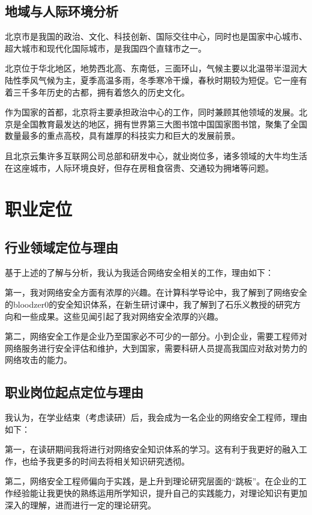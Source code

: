 \documentclass{article}
\begin{document}
\subsection{地域与人际环境分析}

北京市是我国的政治、文化、科技创新、国际交往中心，同时也是国家中心城市、超大城市和现代化国际城市，是我国四个直辖市之一。

北京位于华北地区，地势西北高、东南低，三面环山，气候主要以北温带半湿润大陆性季风气候为主，夏季高温多雨，冬季寒冷干燥，春秋时期较为短促。它一座有着三千多年历史的古都，拥有着悠久的历史文化。

作为国家的首都，北京将主要承担政治中心的工作，同时兼顾其他领域的发展。北京是全国教育最发达的地区，拥有世界第三大图书馆中国国家图书馆，聚集了全国数量最多的重点高校，具有雄厚的科技实力和巨大的发展前景。

且北京云集许多互联网公司总部和研发中心，就业岗位多，诸多领域的大牛均生活在这座城市，人际环境良好，但存在房租食宿贵、交通较为拥堵等问题。

\section{职业定位}

\subsection{行业领域定位与理由}

基于上述的了解与分析，我认为我适合网络安全相关的工作，理由如下：

第一，我对网络安全方面有浓厚的兴趣。在计算科学导论中，我了解到了网络安全的bloodzer0的安全知识体系，在新生研讨课中，我了解到了石乐义教授的研究方向和一些成果。这些见闻引起了我对网络安全浓厚的兴趣。

第二，网络安全工作是企业乃至国家必不可少的一部分。小到企业，需要工程师对网络服务进行安全评估和维护，大到国家，需要科研人员提高我国应对敌对势力的网络攻击的能力。

\subsection{职业岗位起点定位与理由}

我认为，在学业结束（考虑读研）后，我会成为一名企业的网络安全工程师，理由如下：

第一，在读研期间我将进行对网络安全知识体系的学习。这有利于我更好的融入工作，也给予我更多的时间去将相关知识研究透彻。

第二，网络安全工程师偏向于实践，是上升到理论研究层面的“跳板”。在企业的工作经验能让我更快的熟练运用所学知识，提升自己的实践能力，对理论知识有更加深入的理解，进而进行一定的理论研究。
\end{document}
